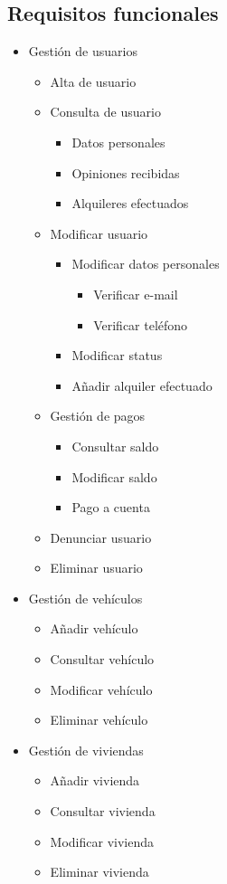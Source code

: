 \documentclass[11pt,spanish]{article} %
\begin{document}
\subsection{Requisitos funcionales}
\begin{itemize}
	\item Gestión de usuarios
	
	\begin{itemize}
		\item Alta de usuario
		\item Consulta de usuario
		\begin{itemize}
			\item Datos personales
			\item Opiniones recibidas
			\item Alquileres efectuados
		\end{itemize}
		\item Modificar usuario
		\begin{itemize}
			\item Modificar datos personales
			\begin{itemize}
				\item Verificar e-mail
				\item Verificar teléfono
			\end{itemize}
			\item Modificar status
			\item Añadir alquiler efectuado
		\end{itemize}
		\item Gestión de pagos
		\begin{itemize}
			\item Consultar saldo
			\item Modificar saldo
			\item Pago a cuenta
		\end{itemize}
		\item Denunciar usuario
		\item Eliminar usuario
	\end{itemize}
	
	\item Gestión de vehículos
	\begin{itemize}
		\item Añadir vehículo
		\item Consultar vehículo
		\item Modificar vehículo
		\item Eliminar vehículo
	\end{itemize}
	\item Gestión de viviendas
	\begin{itemize}
		\item Añadir vivienda
		\item Consultar vivienda
		\item Modificar vivienda
		\item Eliminar vivienda
	\end{itemize}
	

\end{itemize}
\end{document}
